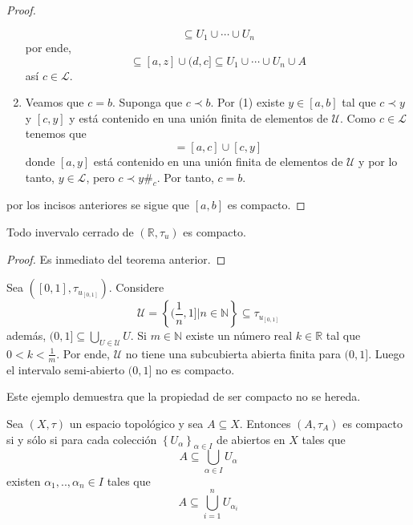 \documentclass[12pt]{report}
\theoremstyle{largebreak}
\newcommand\contradiction{\ensuremath{\#_c}}
\begin{document}
\begin{proof}
\begin{enumerate}
            \begin{equation*}
                [a,z]\subseteq U_1\cup\cdots\cup U_n
            \end{equation*}
            por ende,
            \begin{equation*}
                [a,c]\subseteq [a,z]\cup (d,c]\subseteq U_1\cup\cdots\cup U_n\cup A 
            \end{equation*}
            así $c\in\mathcal{L}$.
            \item Veamos que $c=b$. Suponga que $c\prec b$. Por (1) existe $y\in[a,b]$ tal que $c\prec y$ y $[c,y]$ y está contenido en una unión finita de elementos de $\mathcal{U}$. Como $c\in\mathcal{L}$ tenemos que
            \begin{equation*}
                [a,y]=[a,c]\cup[c,y]
            \end{equation*}
            donde $[a,y]$ está contenido en una unión finita de elementos de $\mathcal{U}$ y por lo tanto, $y\in\mathcal{L}$, pero $c\prec y$\contradiction. Por tanto, $c=b$.
        \end{enumerate}
        por los incisos anteriores se sigue que $[a,b]$ es compacto.
    \end{proof}

    \begin{cor}
        Todo invervalo cerrado de $(\mathbb{R},\tau_u)$ es compacto.
    \end{cor}

    \begin{proof}
        Es inmediato del teorema anterior.
    \end{proof}

    \begin{exa}
        Sea $([0,1],\tau_{u_{[0,1]}})$. Considere
        \begin{equation*}
            \mathcal{U}=\left\{(\frac{1}{n},1]\Big|n\in\mathbb{N} \right\}\subseteq \tau_{u_{[0,1]}}
        \end{equation*}
        además, $(0,1]\subseteq \bigcup_{ U\in\mathcal{U}}U$. Si $m\in\mathbb{N}$ existe un número real $k\in\mathbb{R}$ tal que
        $0<k<\frac{1}{m}$. Por ende, $\mathcal{U}$ no tiene una subcubierta abierta finita para $(0,1]$. Luego el intervalo semi-abierto $(0,1]$ no es compacto.

        Este ejemplo demuestra que la propiedad de ser compacto no se hereda.
    \end{exa}

    \begin{propo}
        Sea $(X,\tau)$ un espacio topológico y sea $A\subseteq X$. Entonces $(A,\tau_A)$ es compacto si y sólo si para cada colección $\left\{U_\alpha \right\}_{\alpha\in I}$ de abiertos en $X$ tales que
        \begin{equation*}
            A\subseteq \bigcup_{\alpha\in I}U_\alpha
        \end{equation*}
        existen $\alpha_1,..,\alpha_n\in I$ tales que
        \begin{equation*}
            A\subseteq\bigcup_{i=1}^n U_{\alpha_i}
        \end{equation*}
    \end{propo}
\end{document}
